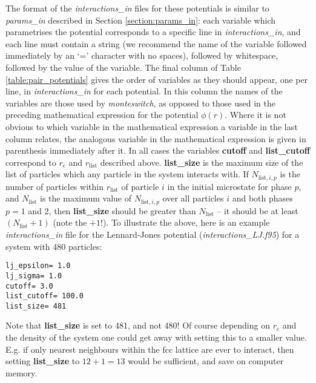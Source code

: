 \documentclass{report}
\begin{document}
The format of the \emph{interactions\_in} files for these potentials is similar to \emph{params\_in} described in Section \ref{section:params_in}:
each variable which parametrises the potential corresponds to a specific line in \emph{interactions\_in}, and each line must contain a string
(we recommend the name of the variable followed immediately by an `=' character with no spaces), followed by whitespace, followed by the value
of the variable. The final column of Table \ref{table:pair_potentials} gives the order of variables as they should appear, one per line, in
\emph{interactions\_in} for each potential. In this column the names of the variables are those used by \emph{monteswitch}, as opposed to those
used in the preceding mathematical expression for the potential $\phi(r)$. Where it is not obvious to which variable in the mathematical expression
a variable in the last column relates, the analogous variable in the mathematical expression is given in parenthesis immediately after it. In all
cases the variables \textbf{cutoff} and \textbf{list\_cutoff} correspond to $r_{\text{c}}$ and $r_{\text{list}}$ described above. \textbf{list\_size} is the
maximum size of the list of particles which any particle in the system interacts with. If $N_{\text{list},i,p}$ is the number of particles within
$r_{\text{list}}$ of particle $i$ in the initial microstate for phase $p$, and $N_{\text{list}}$ is the maximum value of $N_{\text{list},i,p}$ over all particles
$i$ and both phases $p=1$ and 2, then \textbf{list\_size} should be greater than $N_{\text{list}}$ -- it should be at least $(N_{\text{list}}+1)$ (note the
$+1$!). To illustrate the above, here is an example \emph{interactions\_in} file for the Lennard-Jones potential (\emph{interactions\_LJ.f95}) for
a system with 480 particles:
\begin{verbatim}
lj_epsilon= 1.0
lj_sigma= 1.0
cutoff= 3.0
list_cutoff= 100.0
list_size= 481
\end{verbatim}
Note that \textbf{list\_size} is set to 481, and not 480! Of course depending on $r_{\text{c}}$ and the density of the system one could get away with 
setting this to a smaller value. E.g. if only nearest neighbours within the fcc lattice are ever to interact, then setting \textbf{list\_size} to
$12+1=13$ would be sufficient, and save on computer memory.
\end{document}
